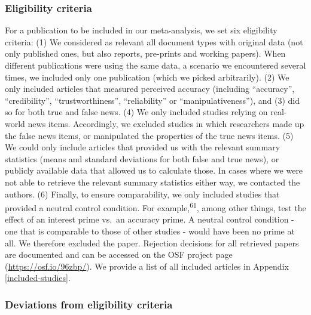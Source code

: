 \documentclass[
  man]{apa6}
\begin{document}
\subsubsection{Eligibility criteria}\label{eligibility-criteria}

For a publication to be included in our meta-analysis, we set six eligibility criteria: (1) We considered as relevant all document types with original data (not only published ones, but also reports, pre-prints and working papers). When different publications were using the same data, a scenario we encountered several times, we included only one publication (which we picked arbitrarily). (2) We only included articles that measured perceived accuracy (including ``accuracy'', ``credibility'', ``trustworthiness'', ``reliability'' or ``manipulativeness''), and (3) did so for both true and false news. (4) We only included studies relying on real-world news items. Accordingly, we excluded studies in which researchers made up the false news items, or manipulated the properties of the true news items. (5) We could only include articles that provided us with the relevant summary statistics (means and standard deviations for both false and true news), or publicly available data that allowed us to calculate those. In cases where we were not able to retrieve the relevant summary statistics either way, we contacted the authors. (6) Finally, to ensure comparability, we only included studies that provided a neutral control condition. For example,\textsuperscript{61}, among other things, test the effect of an interest prime vs.~an accuracy prime. A neutral control condition - one that is comparable to those of other studies - would have been no prime at all. We therefore excluded the paper. Rejection decisions for all retrieved papers are documented and can be accessed on the OSF project page (\url{https://osf.io/96zbp/}). We provide a list of all included articles in Appendix \ref{included-studies}.

\subsubsection{Deviations from eligibility criteria}\label{deviations-from-eligibility-criteria}
\end{document}
